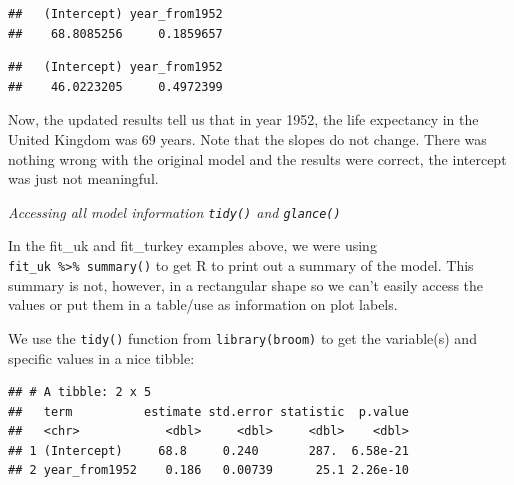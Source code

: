 \documentclass[
  12pt,
  krantz2]{krantz}
\makeatletter
\newenvironment{Shaded}{\begin{snugshade}}{\end{snugshade}}
\newcommand{\KeywordTok}[1]{\textcolor[rgb]{0.13,0.29,0.53}{\textbf{#1}}}
\newcommand{\NormalTok}[1]{#1}
\newcommand{\OperatorTok}[1]{\textcolor[rgb]{0.81,0.36,0.00}{\textbf{#1}}}
\newcommand{\StringTok}[1]{\textcolor[rgb]{0.31,0.60,0.02}{#1}}
\newenvironment{kframe}{%
\medskip{}
\setlength{\fboxsep}{.8em}
 \def\at@end@of@kframe{}%
 \ifinner\ifhmode%
  \def\at@end@of@kframe{\end{minipage}}%
  \begin{minipage}{\columnwidth}%
 \fi\fi%
 \def\FrameCommand##1{\hskip\@totalleftmargin \hskip-\fboxsep
 \colorbox{shadecolor}{##1}\hskip-\fboxsep
     \hskip-\linewidth \hskip-\@totalleftmargin \hskip\columnwidth}%
 \MakeFramed {\advance\hsize-\width
   \@totalleftmargin\z@ \linewidth\hsize
   \@setminipage}}%
 {\par\unskip\endMakeFramed%
 \at@end@of@kframe}
\renewenvironment{Shaded}{\begin{kframe}}{\end{kframe}}
\makeatother
\begin{document}
\begin{Shaded}
\end{Shaded}

\begin{verbatim}
##   (Intercept) year_from1952 
##    68.8085256     0.1859657
\end{verbatim}

\begin{Shaded}
\end{Shaded}

\begin{verbatim}
##   (Intercept) year_from1952 
##    46.0223205     0.4972399
\end{verbatim}

Now, the updated results tell us that in year 1952, the life expectancy in the United Kingdom was 69 years.
Note that the slopes do not change.
There was nothing wrong with the original model and the results were correct, the intercept was just not meaningful.

\emph{Accessing all model information \texttt{tidy()} and \texttt{glance()}}

In the fit\_uk and fit\_turkey examples above, we were using \texttt{fit\_uk\ \%\textgreater{}\%\ summary()} to get R to print out a summary of the model.
This summary is not, however, in a rectangular shape so we can't easily access the values or put them in a table/use as information on plot labels.

We use the \texttt{tidy()} function from \texttt{library(broom)} to get the variable(s) and specific values in a nice tibble:

\begin{Shaded}
\end{Shaded}

\begin{verbatim}
## # A tibble: 2 x 5
##   term          estimate std.error statistic  p.value
##   <chr>            <dbl>     <dbl>     <dbl>    <dbl>
## 1 (Intercept)     68.8     0.240       287.  6.58e-21
## 2 year_from1952    0.186   0.00739      25.1 2.26e-10
\end{verbatim}
\end{document}
